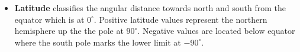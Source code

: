 \begin{itemize}

\item \textbf{Latitude} classifies the angular distance towards north and south from the equator which is at $0^\circ$. Positive latitude values represent the northern hemisphere up the the pole at $90^\circ$. Negative values are located below equator where the south pole marks the lower limit at $-90^\circ$.


\end{itemize}


\cite{Miler10webis}










